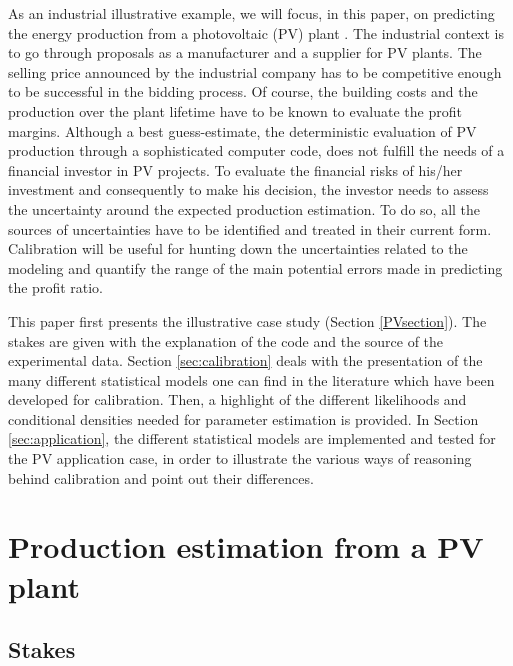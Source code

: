 \documentclass[soumission]{jsfds}
\begin{document}
As an industrial illustrative example, we will focus, in this paper, on predicting the energy production from a photovoltaic (PV) plant \citep{martin2001}. The industrial context is to go through proposals as a manufacturer and a supplier for PV plants. The selling price announced by the industrial company has to be competitive enough to be successful in the bidding process. Of course, the building costs and the production over the plant lifetime have to be known to evaluate the profit margins. Although a best guess-estimate, the deterministic evaluation of PV production through a sophisticated computer code, does not fulfill the needs of a financial investor in  PV projects. To evaluate the financial risks of his/her investment and consequently to make his decision, the investor needs to assess the uncertainty around the expected production estimation. To do so, all the sources of uncertainties have to be identified and treated in their current form. Calibration will be useful for hunting down the uncertainties related to the modeling and quantify the range of the main potential errors made in predicting the profit ratio.\newline



This paper first presents the illustrative case study (Section \ref{PVsection}). The stakes are given with the explanation of the code and the source of the experimental data. Section \ref{sec:calibration} deals with the presentation of the many different statistical models one can find in the literature which have been developed for calibration. Then, a highlight of the different likelihoods and conditional densities needed for parameter estimation is provided. In Section \ref{sec:application}, the different statistical models are implemented and tested for the PV application case, in order to illustrate the various ways of reasoning behind calibration and point out their differences.



\section{Production estimation from a PV plant \label{PVsection}}

\subsection{Stakes}
\end{document}
